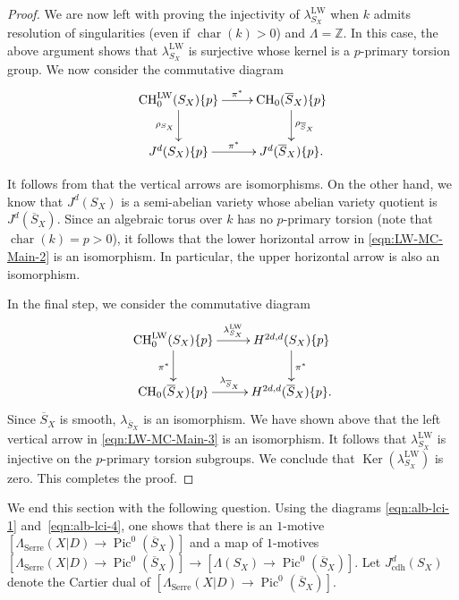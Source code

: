 \documentclass[11pt]{article}
\numberwithin{equation}{section}
\newcommand{\cdh}{\mathrm{cdh}}
\newcommand{\LW}{\mathrm{LW}}
\newcommand{\Serre}{\mathrm{Serre}}
\theoremstyle{definition}
\newcommand{\Z}{{\mathbb Z}}
\DeclareMathOperator{\CH}{CH}
\DeclareMathOperator{\Char}{char}
\DeclareMathOperator{\Ker}{Ker}
\DeclareMathOperator{\Pic}{Pic}
\let\ov\overline
\begin{document}
\begin{proof}
We are now left with proving the injectivity of $\lambda^{\LW}_{S_X}$ when $k$ admits
resolution of singularities (even if $\Char(k) > 0$) and $\Lambda = \Z$.
In this case, the above argument shows that $\lambda^{\LW}_{S_X}$ is surjective whose
kernel is a $p$-primary torsion group.
We now consider the commutative diagram\vspace*{-3pt}
\begin{equation}\label{eqn:LW-MC-Main-2}
\begin{array}{c}
\xymatrix{
\CH^{\LW}_0(S_X)\{p\} \ar[r]^-{\pi^*} \ar[d]_{\rho_{S_X}} &
\CH_0(\ov{S}_X)\{p\} \ar[d]^{\rho_{\ov{S}_X}} \\
J^d(S_X)\{p\} \ar[r]^-{\pi^*} & J^d(\ov{S}_X)\{p\}.}
\end{array}
\end{equation}

It follows from \cite[Th.\,6.4]{Krishna-2} that the vertical arrows are
isomorphisms. On the other hand, we know that $J^d(S_X)$ is a
semi-abelian variety whose abelian variety quotient is $J^d(\ov{S}_X)$.
Since an algebraic torus over $k$ has no $p$-primary torsion (note
that $\Char(k) = p > 0$), it follows that the lower horizontal
arrow in \eqref{eqn:LW-MC-Main-2} is an isomorphism.
In particular, the upper horizontal arrow is also an isomorphism.

In the final step, we consider the commutative diagram\vspace*{-3pt}
\begin{equation}\label{eqn:LW-MC-Main-3}
\begin{array}{c}
\xymatrix{
\CH^{\LW}_0(S_X)\{p\} \ar[r]^-{\lambda^{\LW}_{S_X}} \ar[d]_{\pi^*} &
H^{2d,d}(S_X)\{p\} \ar[d]^{\pi^*} \\
\CH_0(\ov{S}_X)\{p\} \ar[r]^-{\lambda_{\ov{S}_X}} &
H^{2d,d}(\ov{S}_X)\{p\}.}
\end{array}
\end{equation}
Since $\ov{S}_X$ is smooth, $\lambda_{\ov{S}_X}$ is an isomorphism.
We have shown above that
the left vertical arrow in \eqref{eqn:LW-MC-Main-3} is an isomorphism. It follows that
$\lambda^{\LW}_{S_X}$ is injective on the $p$-primary torsion subgroups.
We conclude that $\Ker(\lambda^{\LW}_{S_X})$ is zero.
This completes the proof.
\end{proof}

We end this section with the following question.
Using the diagrams \eqref{eqn:alb-lci-1} and~\eqref{eqn:alb-lci-4},
one shows that there is an $1$-motive
$[\Lambda_{\Serre}(X|D) \to \Pic^0(\ov{S}_X)]$ and a map of
$1$-motives $[\Lambda_{\Serre}(X|D) \to \Pic^0(\ov{S}_X)] \to
[\Lambda(S_X) \to \Pic^0(\ov{S}_X)]$. Let $J^d_{\cdh}(S_X)$ denote the
Cartier dual of $[\Lambda_{\Serre}(X|D) \to \Pic^0(\ov{S}_X)]$.
\end{document}
